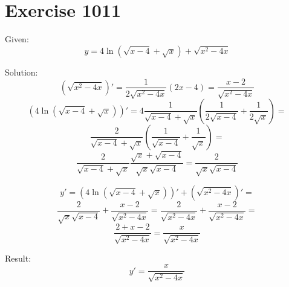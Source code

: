 \documentclass[a4paper, 10pt]{scrartcl}
\begin{document}
\section{Exercise 1011}

Given:
\[
y = 4\ln{(\sqrt{x - 4} + \sqrt{x})} + \sqrt{x^{2} - 4x}
\]

Solution:
\[
(\sqrt{x^{2} - 4x})' = \frac{1}{2\sqrt{x^{2} - 4x}}(2x - 4) = \frac{x - 2}{\sqrt{x^{2} - 4x}}
\]
\[
(4\ln{(\sqrt{x - 4} + \sqrt{x})})' = 4\frac{1}{\sqrt{x - 4} + \sqrt{x}}\left(\frac{1}{2\sqrt{x - 4}} + \frac{1}{2\sqrt{x}}\right) =
\]
\[
\frac{2}{\sqrt{x - 4} + \sqrt{x}}\left(\frac{1}{\sqrt{x - 4}} + \frac{1}{\sqrt{x}}\right) =
\]
\[
\frac{2}{\sqrt{x - 4} + \sqrt{x}}\frac{\sqrt{x} + \sqrt{x - 4}}{\sqrt{x}\sqrt{x - 4}} = \frac{2}{\sqrt{x}\sqrt{x - 4}}
\]

\[
y' = (4\ln{(\sqrt{x - 4} + \sqrt{x})})' + (\sqrt{x^{2} - 4x})' =
\]
\[
\frac{2}{\sqrt{x}\sqrt{x - 4}} + \frac{x - 2}{\sqrt{x^{2} - 4x}} = \frac{2}{\sqrt{x^{2} - 4x}} + \frac{x - 2}{\sqrt{x^{2} - 4x}} =
\]
\[
\frac{2 + x - 2}{\sqrt{x^{2} - 4x}} = \frac{x}{\sqrt{x^{2} - 4x}}
\]

Result:
\[
y' = \frac{x}{\sqrt{x^{2} - 4x}}
\]
\end{document}
